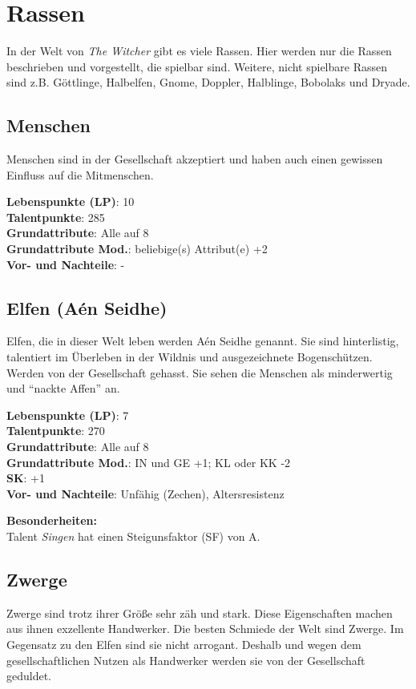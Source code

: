 {\let\clearpage\relax\chapter{Rassen}}
In der Welt von \textit{The Witcher} gibt es viele Rassen. Hier werden nur die Rassen beschrieben und vorgestellt, die spielbar sind. Weitere, nicht spielbare Rassen sind z.B. Göttlinge, Halbelfen, Gnome, Doppler, Halblinge, Bobolaks und Dryade.

\section{Menschen}
Menschen sind in der Gesellschaft akzeptiert und haben auch einen gewissen Einfluss auf die Mitmenschen.

\textbf{Lebenspunkte (LP)}: 10 \\
\textbf{Talentpunkte}: 285 \\
\textbf{Grundattribute}: Alle auf 8 \\
\textbf{Grundattribute Mod.}: beliebige(s) Attribut(e) +2  \\
\textbf{Vor- und Nachteile}: - 

\section{Elfen (Aén Seidhe)}
Elfen, die in dieser Welt leben werden Aén Seidhe genannt. Sie sind hinterlistig, talentiert im Überleben in der Wildnis und ausgezeichnete Bogenschützen. Werden von der Gesellschaft gehasst. Sie sehen die Menschen als minderwertig und "`nackte Affen"' an.

\textbf{Lebenspunkte (LP)}: 7 \\
\textbf{Talentpunkte}: 270 \\
\textbf{Grundattribute}: Alle auf 8 \\
\textbf{Grundattribute Mod.}: IN und GE +1; KL oder KK -2 \\
\textbf{SK}: +1 \\
\textbf{Vor- und Nachteile}: Unfähig (Zechen), Altersresistenz

\textbf{Besonderheiten:} \\
Talent \textit{Singen} hat einen Steigunsfaktor (SF) von A.

\section{Zwerge}
Zwerge sind trotz ihrer Größe sehr zäh und stark. Diese Eigenschaften machen aus ihnen exzellente Handwerker. Die besten Schmiede der Welt sind Zwerge. Im Gegensatz zu den Elfen sind sie nicht arrogant. Deshalb und wegen dem gesellschaftlichen Nutzen als Handwerker werden sie von der Gesellschaft geduldet.

